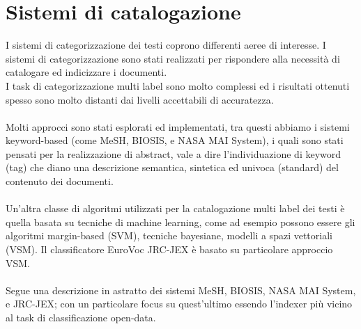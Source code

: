 \documentclass{article}
\theoremstyle{plain}
\theoremstyle{definition}
\begin{document}
\section{Sistemi di catalogazione}
I sistemi di categorizzazione dei testi coprono differenti aeree di interesse. I sistemi di categorizzazione sono stati realizzati per rispondere alla necessità di catalogare ed indicizzare i documenti. 
\\
I task di categorizzazione multi label sono molto complessi ed i risultati ottenuti spesso sono molto distanti dai livelli accettabili di accuratezza.
\\
\\
Molti approcci sono stati esplorati ed implementati, tra questi abbiamo i sistemi keyword-based (come MeSH, BIOSIS, e NASA MAI System), i quali sono stati pensati per la realizzazione di abstract, vale a dire l'individuazione di keyword (tag) che diano una descrizione semantica, sintetica ed univoca (standard) del contenuto dei documenti. 
\\
\\
Un'altra classe di algoritmi utilizzati per la catalogazione multi label dei testi è quella basata su tecniche di machine learning, come ad esempio possono essere gli algoritmi margin-based (SVM), tecniche bayesiane, modelli a spazi vettoriali (VSM). Il classificatore EuroVoc JRC-JEX è basato su particolare approccio VSM.
\\
\\
Segue una descrizione in astratto dei sistemi MeSH, BIOSIS, NASA MAI System, e JRC-JEX; con un particolare focus su quest'ultimo essendo l'indexer più vicino al task di classificazione open-data.
\end{document}
